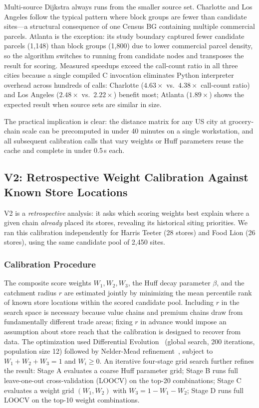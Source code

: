 \documentclass[conference]{IEEEtran}
\begin{document}
Multi-source Dijkstra always runs from the smaller source set.
Charlotte and Los Angeles follow the typical pattern where block
groups are fewer than candidate sites---a structural consequence of
one Census BG containing multiple commercial parcels. Atlanta is the
exception: its study boundary captured fewer candidate parcels
(1{,}148) than block groups (1{,}800) due to lower commercial parcel
density, so the algorithm switches to running from candidate nodes and
transposes the result for scoring. Measured speedups exceed the
call-count ratio in all three cities because a single compiled C
invocation eliminates Python interpreter overhead across hundreds of
calls: Charlotte ($4.63\times$ vs.\ $4.38\times$ call-count ratio)
and Los Angeles ($2.48\times$ vs.\ $2.22\times$) benefit most;
Atlanta ($1.89\times$) shows the expected result when source sets
are similar in size.

The practical implication is clear: the distance matrix for any
US city at grocery-chain scale can be precomputed in under 40
minutes on a single workstation, and all subsequent calibration
calls that vary weights or Huff parameters reuse the cache and
complete in under 0.5\,s each.

\subsection{V2: Retrospective Weight Calibration Against Known Store Locations}
\label{sec:v2}

V2 is a \textit{retrospective} analysis: it asks which scoring
weights best explain where a given chain \textit{already} placed its
stores, revealing its historical siting priorities. We ran this
calibration independently for Harris Teeter (28 stores) and Food
Lion (26 stores), using the same candidate pool of 2{,}450 sites.

\subsubsection{Calibration Procedure}

The composite score weights $W_1, W_2, W_3$, the Huff decay
parameter $\beta$, and the catchment radius $r$ are estimated jointly
by minimizing the mean percentile rank of known store locations within
the scored candidate pool. Including $r$ in the search space is
necessary because value chains and premium chains draw from
fundamentally different trade areas; fixing $r$ in advance would
impose an assumption about store reach that the calibration is
designed to recover from data.
The optimization used Differential Evolution~\cite{Storn1997}
(global search, 200 iterations, population size 12) followed by
Nelder-Mead refinement~\cite{Nelder1965}, subject to
$W_1 + W_2 + W_3 = 1$ and $W_i \geq 0$. An iterative four-stage
grid search further refines the result: Stage A evaluates a coarse
Huff parameter grid; Stage B runs full leave-one-out
cross-validation (LOOCV) on the top-20 combinations; Stage C
evaluates a weight grid $(W_1, W_2)$ with $W_3 = 1 - W_1 - W_2$;
Stage D runs full LOOCV on the top-10 weight combinations.
\end{document}
